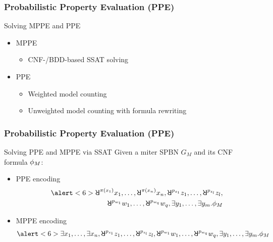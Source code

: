 \begin{frame}
  \frametitle{Probabilistic Property Evaluation (PPE)}
  \begin{block}{Solving MPPE and PPE}
    \begin{itemize}
      \item MPPE
            \pause
            \begin{itemize}
              \item CNF-/BDD-based SSAT solving
                    \pause
            \end{itemize}
      \item PPE
            \pause
            \begin{itemize}
              \item Weighted model counting
                    \pause
              \item Unweighted model counting with formula rewriting
            \end{itemize}
    \end{itemize}
  \end{block}
\end{frame}

\begin{frame}
  \frametitle{Probabilistic Property Evaluation (PPE)}
  \begin{block}{Solving PPE and MPPE via SSAT}
    Given a miter SPBN $G_M$ and its CNF formula $\phi_M$:
    \pause
    \begin{itemize}
      \item PPE encoding
            \pause
            \belowdisplayskip=0pt
            \begin{align*}
              \alert<6>{\random{\pi(x_1)}x_1,\ldots,\random{\pi(x_n)}x_n},
              \random{p_{z_1}}z_1,\ldots,\random{p_{z_l}}z_l, \\
              \random{p_{w_1}}w_1,\ldots,\random{p_{w_q}}w_q,
              \exists y_1,\ldots,\exists y_m.
              \pf_M
            \end{align*}
            \pause
      \item MPPE encoding
            \pause
            \begin{align*}
              \alert<6>{\exists x_1,\ldots,\exists x_n},
              \random{p_{z_1}}z_1,\ldots,\random{p_{z_l}}z_l,
              \random{p_{w_1}}w_1,\ldots,\random{p_{w_q}}w_q,
              \exists y_1,\ldots,\exists y_m.
              \pf_M
            \end{align*}
    \end{itemize}
  \end{block}
\end{frame}

